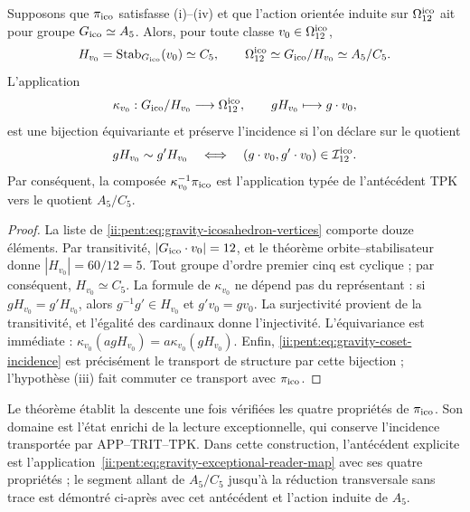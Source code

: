 


\begin{theorem}
\label{ii:pent:thm:gravity-exceptional-descent}
Supposons que \(\pi_{\rm ico}\) satisfasse (i)--(iv) et que l’action
orientée induite sur \(\Omega_{12}^{\rm ico}\) ait pour groupe
\(G_{\rm ico}\simeq A_5\). Alors, pour toute classe
\(v_0\in\Omega_{12}^{\rm ico}\),
\begin{equation}
\label{ii:pent:eq:gravity-icosahedral-quotient}
H_{v_0}=\operatorname{Stab}_{G_{\rm ico}}(v_0)\simeq C_5,
\qquad
\Omega_{12}^{\rm ico}\simeq G_{\rm ico}/H_{v_0}\simeq A_5/C_5.
\end{equation}
L’application
\begin{equation}
\label{ii:pent:eq:gravity-coset-map}
\kappa_{v_0}:G_{\rm ico}/H_{v_0}\longrightarrow\Omega_{12}^{\rm ico},
\qquad gH_{v_0}\longmapsto g\cdot v_0,
\end{equation}
est une bijection équivariante et préserve l’incidence si l’on déclare sur le quotient
\begin{equation}
\label{ii:pent:eq:gravity-coset-incidence}
gH_{v_0}\sim g'H_{v_0}
\quad\Longleftrightarrow\quad
(g\cdot v_0,g'\cdot v_0)\in\mathcal I_{12}^{\rm ico}.
\end{equation}
Par conséquent, la composée \(\kappa_{v_0}^{-1}\pi_{\rm ico}\) est l’application
typée de l’antécédent TPK vers le quotient \(A_5/C_5\).
\end{theorem}

\begin{proof}
La liste de \eqref{ii:pent:eq:gravity-icosahedron-vertices} comporte douze éléments.
Par transitivité, \(|G_{\rm ico}\cdot v_0|=12\), et le théorème
orbite--stabilisateur donne \(|H_{v_0}|=60/12=5\). Tout groupe d’ordre
premier cinq est cyclique ; par conséquent, \(H_{v_0}\simeq C_5\). La formule de
\(\kappa_{v_0}\) ne dépend pas du représentant : si
\(gH_{v_0}=g'H_{v_0}\), alors \(g^{-1}g'\in H_{v_0}\) et
\(g'v_0=gv_0\). La surjectivité provient de la transitivité, et
l’égalité des cardinaux donne l’injectivité. L’équivariance est immédiate :
\(\kappa_{v_0}(agH_{v_0})=a\kappa_{v_0}(gH_{v_0})\). Enfin,
\eqref{ii:pent:eq:gravity-coset-incidence} est précisément le transport de
structure par cette bijection ; l’hypothèse (iii) fait commuter ce
transport avec \(\pi_{\rm ico}\).
\end{proof}

Le théorème établit la descente une fois vérifiées les quatre
propriétés de \(\pi_{\rm ico}\). Son domaine est l’état enrichi
de la lecture exceptionnelle, qui conserve l’incidence transportée par
APP--TRIT--TPK. Dans cette construction, l’antécédent explicite est
l’application~\eqref{ii:pent:eq:gravity-exceptional-reader-map} avec ses quatre
propriétés ; le segment allant de \(A_5/C_5\) jusqu’à la réduction transversale sans
trace est démontré ci-après avec cet antécédent et l’action induite
de \(A_5\).

